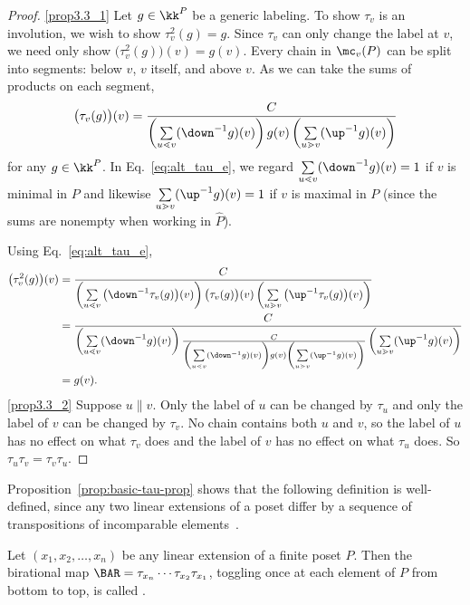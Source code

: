 \begin{proof}
\ref{prop3.3_1}
Let $g\in \kk^P$ be a generic labeling.
To show $\tau_v$ is an involution, we wish to show
$\tau_v^2(g)=g$.
Since $\tau_v$ can only change the label at $v$, we need only show
$\big(\tau_v^2(g)\big)(v)=g(v)$.
Every chain in $\mc_v(P)$ can be split into segments: below $v$, $v$ itself, and above $v$. As we can take the sums of products on each segment,
\begin{equation}\label{eq:alt_tau_e}
\big(\tau_v(g)\big)(v) =
\frac{C}{\left(\sum\limits_{u\lessdot v}
(\down^{-1}g)(v)\right) g(v) \left(\sum\limits_{u\gtrdot v}
(\up^{-1}g)(v)\right)}
\end{equation}
for any $g\in\kk^P$.
In Eq.~\eqref{eq:alt_tau_e}, we regard
$\sum\limits_{u\lessdot v}
(\down^{-1}g)(v)=1$ if $v$ is minimal in $P$ and likewise $\sum\limits_{u\gtrdot v}
(\up^{-1}g)(v)=1$ if $v$ is maximal in $P$
(since the sums are nonempty when working in $\widehat{P}$).

Using Eq.~\eqref{eq:alt_tau_e},
\begin{align*}
 \big(\tau_v^2(g)\big)(v) &=
 \frac{C}{\left(\sum\limits_{u\lessdot v}
\big(\down^{-1}\tau_v(g)\big)(v)\right) \big(\tau_v(g)\big)(v) \left(\sum\limits_{u\gtrdot v}
\big(\up^{-1}\tau_v(g)\big)(v)\right)}\\
&=\frac{C}{\left(\sum\limits_{u\lessdot v}
(\down^{-1}g)(v)\right) \frac{C}{\left(\sum\limits_{u\lessdot v}
(\down^{-1}g)(v)\right) g(v) \left(\sum\limits_{u\gtrdot v}
(\up^{-1}g)(v)\right)} \left(\sum\limits_{u\gtrdot v}
(\up^{-1}g)(v)\right)}\\
&=g(v).
\end{align*}
\ref{prop3.3_2} %
Suppose $u \parallel v$.
Only the label of $u$ can be changed by $\tau_u$ and only the label of $v$ can be changed by $\tau_v$.
No chain contains both $u$ and $v$, so the label of $u$ has no effect on what $\tau_v$ does and the label of $v$ has no effect on what $\tau_u$ does. So $\tau_u\tau_v=\tau_v\tau_u$.
\end{proof}

Proposition~\ref{prop:basic-tau-prop}
shows that the following definition is
well-defined, since any two linear extensions of a
poset differ by a sequence of transpositions of incomparable elements~\cite{etienne-84}.

\begin{defi}\label{def:BAR}
Let $(x_1,x_2,\dots,x_n)$ be any linear extension of a finite poset $P$. Then the birational
map $\BAR=\tau_{x_n}\cdots \tau_{x_2} \tau_{x_1}$, \ie toggling once at each element of $P$
from bottom to top, is called .
\end{defi}


